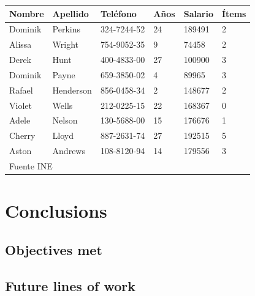 \documentclass[12pt]{report} %
\begin{document}
\begin{table} [h]
	{\begin{tabular}{|p{1.75cm}|p{2cm}|p{2.5cm}|p{1.5cm}|p{2.5cm}|p{1.5cm}|}
		\hline
		\rowcolor{gray75}	
		Nombre & Apellido & Teléfono & Años & Salario & Ítems \\
		\hline 
		Dominik & Perkins & 324-7244-52 & 24 & 189491 & 2 \\
		\hline
		Alissa & Wright & 754-9052-35 & 9 & 74458 & 2 \\
		\hline
		Derek & Hunt & 400-4833-00 & 27 & 100900 & 3 \\
		\hline
		Dominik & Payne & 659-3850-02 & 4 & 89965 & 3 \\
		\hline
		Rafael & Henderson & 856-0458-34 & 2 & 148677 & 2 \\
		\hline
		Violet & Wells & 212-0225-15 & 22 & 168367 & 0\\
		\hline
		Adele & Nelson & 130-5688-00 & 15 & 176676 & 1 \\
		\hline
		Cherry & Lloyd & 887-2631-74 & 27 & 192515 & 5 \\
		\hline
		Aston & Andrews & 108-8120-94 & 14 & 179556 & 3 \\
		\hline
		\multicolumn{6}{|l|}{Fuente INE} \\
		\hline
	\end{tabular}}
\end{table}

\lipsum[6]

\chapter{Conclusions}

\section{Objectives met}
\lipsum[15-16]

\section{Future lines of work}
\lipsum[12-13]

	


\nocite{*} %
\end{document}
